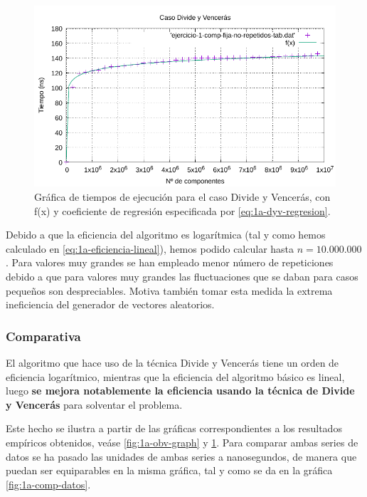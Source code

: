 \begin{figure}
	\centering
	\includegraphics[scale=0.76]{img/e1a-dyv}
	\caption{Gráfica de tiempos de ejecución para el caso Divide y Vencerás, 
		con f(x) y coeficiente de regresión especificada por \ref{eq:1a-dyv-regresion}.}
	\label{fig:1a-dyv-graph}
\end{figure}

Debido a que la eficiencia del algoritmo es logarítmica (tal y como hemos calculado en \ref{eq:1a-eficiencia-lineal}),
hemos podido calcular hasta $n = 10.000.000$. Para valores muy grandes se han empleado menor número de repeticiones
debido a que para valores muy grandes las fluctuaciones que se daban para casos pequeños son despreciables. 
Motiva también tomar esta medida la extrema ineficiencia del generador de vectores aleatorios. 

\newpage

\subsubsection{Comparativa}

El algoritmo que hace uso de la técnica Divide y Vencerás tiene un orden de eficiencia logarítmico, mientras
que la eficiencia del algoritmo básico es lineal, luego \textbf{se mejora notablemente la eficiencia usando la técnica de 
Divide y Vencerás} para solventar el problema. 
   
Este hecho se ilustra a partir de las gráficas correspondientes a los resultados empíricos obtenidos, veáse 
\ref{fig:1a-obv-graph} y \ref{fig:1a-dyv-graph}. Para comparar ambas series de datos se ha pasado las unidades
de ambas series a nanosegundos, de manera que puedan ser equiparables en la misma gráfica, tal y como se da en 
la gráfica \ref{fig:1a-comp-datos}. 

